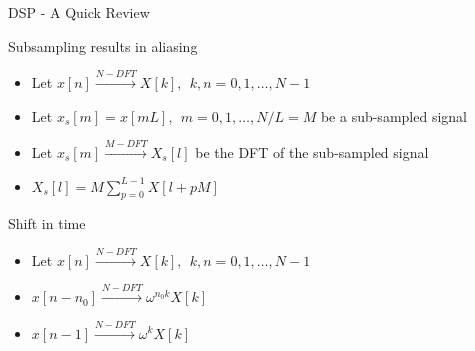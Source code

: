 \documentclass[10pt,xcolor=table]{beamer}
\begin{document}
	\begin{frame}{DSP - A Quick Review}
\begin{block}{Subsampling results in aliasing}
\begin{itemize}
  \item Let $x[n] \xrightarrow{N-DFT} X[k] , \ \ k,n = 0,1, \ldots,N-1$
  \item Let $x_{s}[m]  = x[mL] , \ \ m = 0,1, \ldots, N/L=M$ be a sub-sampled signal
  \item Let $x_s[m] \xrightarrow{M-DFT} X_s[l]$ be the DFT of the sub-sampled signal
  \item $\boxed{X_s[l] = M\sum\limits_{p=0}^{L-1}X[l+pM]}$
\end{itemize}
\end{block}
\pause
\begin{block}{Shift in time}
\begin{itemize}
  \item Let $x[n] \xrightarrow{N-DFT} X[k] , \ \ k,n = 0,1, \ldots,N-1$
  \item $x[n-n_0] \xrightarrow{N-DFT} \omega^{n_0k} X[k]$
  \item $x[n-1] \xrightarrow{N-DFT} \omega^k X[k]$
\end{itemize}
\end{block}
\end{frame}
\end{document}
